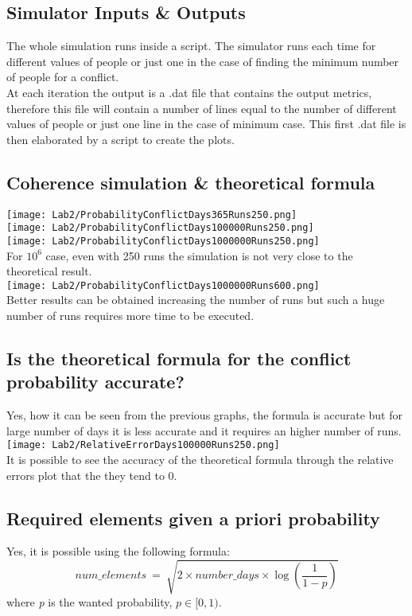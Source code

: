 \documentclass[twocolumn,letterpaper]{report}
\begin{document}
{	\subsection{Simulator Inputs \& Outputs}
			The whole simulation runs inside a script. The simulator runs each time for different values of people or just one in the case of finding the minimum number of people for a conflict. \\
			At each iteration the output is a .dat file that contains the output metrics, therefore this file will contain a number of lines equal to the number of different values of people or just one line in the case of minimum case. This first .dat file is then elaborated by a script to create the plots.
		
		\subsection{Coherence simulation \& theoretical formula}
				\texttt{[image: Lab2/ProbabilityConflictDays365Runs250.png]} \\
				\texttt{[image: Lab2/ProbabilityConflictDays100000Runs250.png]} \\
				\texttt{[image: Lab2/ProbabilityConflictDays1000000Runs250.png]} \\
				For $10^6$ case, even with 250 runs the simulation is not very close to the theoretical result. \\
				\texttt{[image: Lab2/ProbabilityConflictDays1000000Runs600.png]} \\
				Better results can be obtained increasing the number of runs but such a huge number of runs requires more time to be executed.
				
		\subsection{Is the theoretical formula for the conflict probability accurate?}
				Yes, how it can be seen from the previous graphs, the formula is accurate but for large number of days it is less accurate and it requires an higher number of runs.
				\texttt{[image: Lab2/RelativeErrorDays100000Runs250.png]} \\
				It is possible to see the accuracy of the theoretical formula through the relative errors plot that the they tend to 0.
				
				
		\subsection{Required elements given a priori probability}
				Yes, it is possible using the following formula:
				\[
						num\_elements \: = \: \sqrt{2 \times number\_days \times \log{ \left( \frac{1}{1-p} \right) } }
				\]
							where \emph{p} is the wanted probability, $ p \in [0,1)$. \\
							
}
\end{document}
